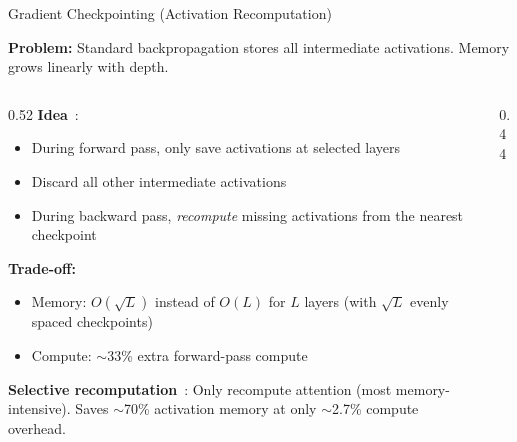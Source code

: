 \begin{frame}{Gradient Checkpointing (Activation Recomputation)}

  \textbf{Problem:} Standard backpropagation stores all intermediate activations. Memory grows linearly with depth.

  \vspace{0.3em}
  \begin{columns}
    \begin{column}{0.52\textwidth}
      \textbf{Idea}~\cite{chen2016checkpointing}:
      \begin{itemize}
        \item During forward pass, only save activations at selected  layers
        \item Discard all other intermediate activations
        \item During backward pass, \emph{recompute} missing activations from the nearest checkpoint
      \end{itemize}

      \vspace{0.3em}
      \textbf{Trade-off:}
      \begin{itemize}
        \item Memory: $O(\sqrt{L})$ instead of $O(L)$ for $L$ layers (with $\sqrt{L}$ evenly spaced checkpoints)
        \item Compute: $\sim$33\% extra forward-pass compute
      \end{itemize}

      \vspace{0.3em}
      \textbf{Selective recomputation}~\cite{korthikanti2023selective}: Only recompute attention (most memory-intensive). Saves $\sim$70\% activation memory at only $\sim$2.7\% compute overhead.
    \end{column}
    \begin{column}{0.44\textwidth}
      \centering
\end{column}
\end{columns}
\end{frame}
